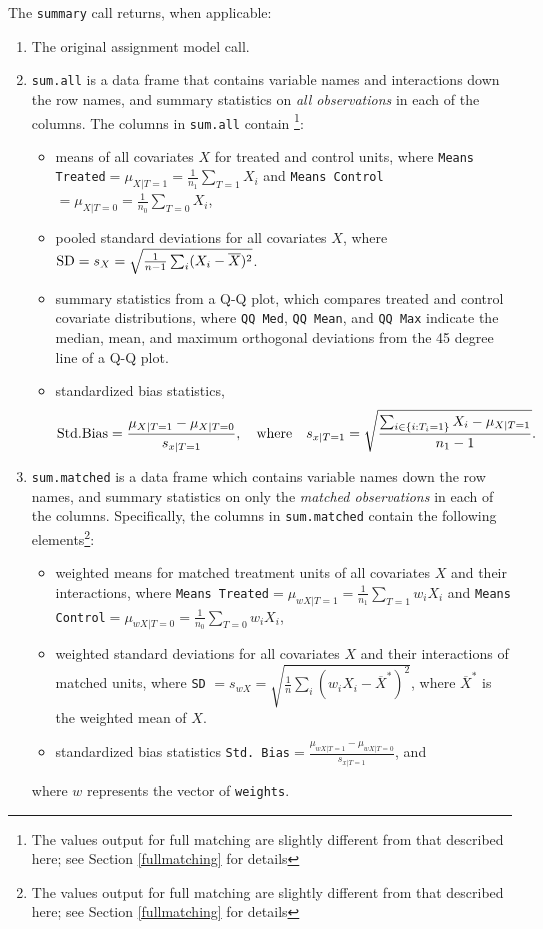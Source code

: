 \documentclass[oneside,letterpaper,titlepage]{article}
\begin{document}
The \texttt{summary} call returns, when applicable:

\begin{enumerate}
\item The original assignment model call.
\item \texttt{sum.all} is a data frame that contains variable names
  and interactions down the row names, and summary statistics on
  \emph{all observations} in each of the columns.  The columns in
  \texttt{sum.all} contain \footnote{The values output for full
    matching are slightly different from that described here; see
    Section \ref{fullmatching} for details}:
  \begin{itemize}
  \item means of all covariates $X$ for treated and control units,
    where \texttt{Means Treated}$= \mu_{X|T=1} = \frac{1}{n_1}
    \sum_{T=1} X_i$ and \texttt{Means Control}$= \mu_{X|T=0} =
    \frac{1}{n_0} \sum_{T=0} X_i$,
  \item pooled standard deviations for all covariates $X$, where ${\rm
      SD} = s_X = \sqrt{\frac{1}{n-1} \sum_{i} (X_i -
      \overline{X})^2}$.
  \item summary statistics from a Q-Q plot, which compares treated and
    control covariate distributions, where \texttt{QQ Med}, \texttt{QQ
      Mean}, and \texttt{QQ Max} indicate the median, mean,
    and maximum orthogonal deviations from the 45 degree line of a Q-Q
    plot.
  \item standardized bias statistics, $${\rm Std.
      Bias}=\frac{\mu_{X|T=1} - \mu_{X|T=0}}{s_{x|T=1}}, \quad {\rm
      where} \quad s_{x|T=1} = \sqrt{\frac{\sum_{i \in \{i:
        T_i=1\}} X_i - \mu_{X|T=1}}{n_1-1} }.$$
  \end{itemize}
  
\item \texttt{sum.matched} is a data frame which contains variable
  names down the row names, and summary statistics on only the
  \emph{matched observations} in each of the columns.  Specifically,
  the columns in \texttt{sum.matched} contain the following
  elements\footnote{The values output for full matching are slightly
    different from that described here; see Section \ref{fullmatching}
    for details}:
  \begin{itemize}
  \item weighted means for matched treatment units of all covariates
    $X$ and their interactions, where \texttt{Means Treated}$=
    \mu_{wX|T=1} = \frac{1}{n_1} \sum_{T=1} w_iX_i$ and \texttt{Means
      Control}$=\mu_{wX|T=0} = \frac{1}{n_0} \sum_{T=0} w_iX_i$,
  \item weighted standard deviations for all covariates $X$ and their
    interactions of matched units, where \texttt{SD} $= s_{wX} =
    \sqrt{\frac{1}{n} \sum_{i} (w_iX_i - \overline{X}^*)^2}$, where
    $\overline{X}^*$ is the weighted mean of $X$.
  \item standardized bias statistics \texttt{Std. Bias}$=\frac{\mu_{wX|T=1} -
      \mu_{wX|T=0}}{s_{x|T=1}}$, and
  \end{itemize}
  where $w$ represents the vector of \texttt{weights}.  
  

\end{enumerate}
\end{document}
